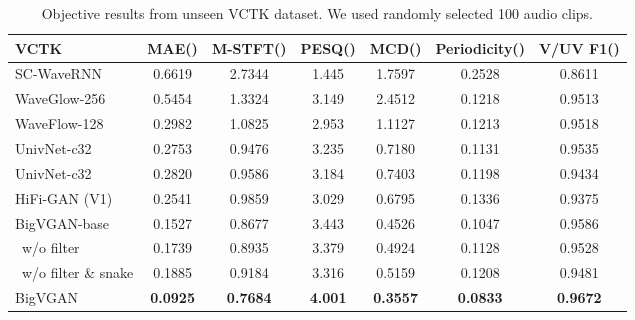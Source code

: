 \documentclass{article} \usepackage{iclr2023_conference,times}
\theoremstyle{plain}
\theoremstyle{definition}
\theoremstyle{remark}
\begin{document}
\begin{table*}[h]
\caption{\footnotesize
Objective results from unseen VCTK dataset. We used randomly selected 100 audio clips. 
}
\label{vctk}
\vspace{-0.05cm}
\begin{center}
\begin{small}
\begin{adjustbox}{width=0.9\textwidth}
\begin{tabular}{l|cccccc}
\toprule
VCTK  & MAE() & M-STFT() & PESQ() & MCD() & Periodicity() & V/UV F1()\\
\midrule
SC-WaveRNN & 0.6619 & 2.7344 & 1.445 & 1.7597 & 0.2528 & 0.8611 \\
WaveGlow-256 & 0.5454 & 1.3324 & 3.149 & 2.4512 & 0.1218 & 0.9513 \\
WaveFlow-128 & 0.2982 & 1.0825 & 2.953 & 1.1127 & 0.1213 & 0.9518 \\
UnivNet-c32  & 0.2753 & 0.9476 & 3.235 & 0.7180 & 0.1131 & 0.9535 \\
UnivNet-c32  & 0.2820 & 0.9586 & 3.184 & 0.7403 & 0.1198 & 0.9434 \\
HiFi-GAN (V1)   & 0.2541 & 0.9859 & 3.029 & 0.6795 & 0.1336 & 0.9375  \\
\midrule
BigVGAN-base    & 0.1527 & 0.8677 & 3.443 & 0.4526 & 0.1047 & 0.9586 \\
\ w/o filter    & 0.1739 & 0.8935 & 3.379 & 0.4924 & 0.1128 & 0.9528 \\
\ w/o filter \& snake    & 0.1885 & 0.9184 & 3.316 & 0.5159 & 0.1208 & 0.9481 \\
\midrule
BigVGAN    & \textbf{0.0925} & \textbf{0.7684} & \textbf{4.001} & \textbf{0.3557} & \textbf{0.0833} & \textbf{0.9672} \\
\bottomrule
\end{tabular}
\end{adjustbox}
\end{small}
\end{center}
\vskip -0.1in
\end{table*}
\end{document}
